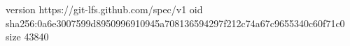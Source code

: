 version https://git-lfs.github.com/spec/v1
oid sha256:0a6e3007599d8950996910945a708136594297f212c74a67c9655340c60f71c0
size 43840
